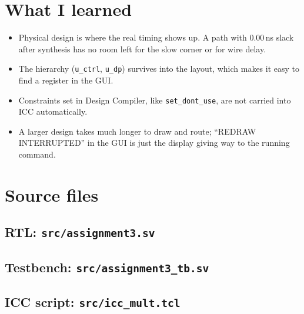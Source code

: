 \documentclass[11pt,a4paper]{article}
\begin{document}
\section{What I learned}
\begin{itemize}
\item Physical design is where the real timing shows up. A path with 0.00\,ns slack after synthesis has no room
      left for the slow corner or for wire delay.
\item The hierarchy (\texttt{u\_ctrl}, \texttt{u\_dp}) survives into the layout, which makes it easy to find a
      register in the GUI.
\item Constraints set in Design Compiler, like \texttt{set\_dont\_use}, are not carried into ICC automatically.
\item A larger design takes much longer to draw and route; ``REDRAW INTERRUPTED'' in the GUI is just the
      display giving way to the running command.
\end{itemize}

\appendix
\section{Source files}
\subsection*{RTL: \texttt{src/assignment3.sv}}

\subsection*{Testbench: \texttt{src/assignment3\_tb.sv}}

\subsection*{ICC script: \texttt{src/icc\_mult.tcl}}

\end{document}
